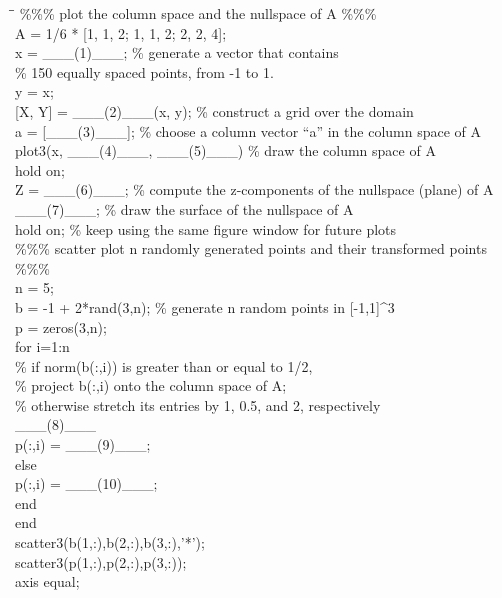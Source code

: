 \begin{problem}
{\small\ttfamily
\begin{tabbing}
\hspace{2em}\=\hspace{2em}\=\kill
\%\%\% plot the column space and the nullspace of A \%\%\%\\
A = 1/6 * [1, 1, 2; 1, 1, 2; 2, 2, 4];\\
x = \_\_\_(1)\_\_\_; \% generate a vector that contains\\
\>\% 150 equally spaced points, from -1 to 1.\\
y = x;\\
{}[X, Y] = \_\_\_(2)\_\_\_(x, y); \% construct a grid over the domain\\[0.15em]
a = [\_\_\_(3)\_\_\_]; \% choose a column vector ``a'' in the column space of A\\
plot3(x, \_\_\_(4)\_\_\_, \_\_\_(5)\_\_\_) \% draw the column space of A\\
hold on;\\[0.15em]
Z = \_\_\_(6)\_\_\_; \% compute the z-components of the nullspace (plane) of A\\
\_\_\_(7)\_\_\_; \% draw the surface of the nullspace of A\\
hold on; \% keep using the same figure window for future plots\\[0.15em]
\%\%\% scatter plot n randomly generated points and their transformed points \%\%\%\\
n = 5;\\
b = -1 + 2*rand(3,n); \% generate n random points in [-1,1]\textasciicircum 3\\
p = zeros(3,n);\\
for i=1:n\\
\>\% if norm(b(:,i)) is greater than or equal to 1/2,\\
\>\% project b(:,i) onto the column space of A;\\
\>\% otherwise stretch its entries by 1, 0.5, and 2, respectively\\
\>\_\_\_(8)\_\_\_\\
\>\>p(:,i) = \_\_\_(9)\_\_\_;\\
\>else\\
\>\>p(:,i) = \_\_\_(10)\_\_\_;\\
\>end\\
end\\[0.15em]
scatter3(b(1,:),b(2,:),b(3,:),'*');\\
scatter3(p(1,:),p(2,:),p(3,:));\\
axis equal;
\end{tabbing}
}
\end{problem}


